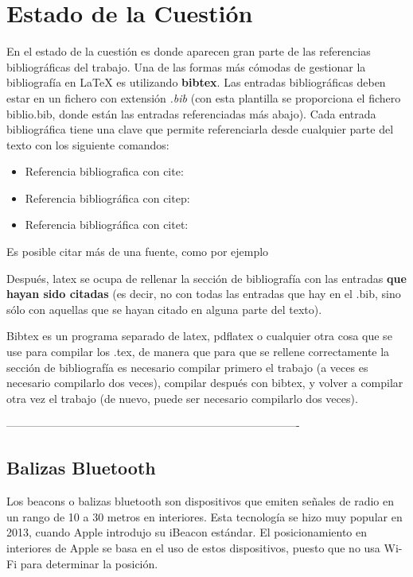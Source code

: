 \chapter{Estado de la Cuestión}
\label{cap:estadoDeLaCuestion}

En el estado de la cuestión es donde aparecen gran parte de las referencias bibliográficas del trabajo. Una de las formas más cómodas de gestionar la bibliografía en {\LaTeX} es utilizando \textbf{bibtex}. Las entradas bibliográficas deben estar en un fichero con extensión \textit{.bib} (con esta plantilla se proporciona el fichero biblio.bib, donde están las entradas referenciadas más abajo). Cada entrada bibliográfica tiene una clave que permite referenciarla desde cualquier parte del texto con los siguiente comandos:

\begin{itemize}
\item Referencia bibliografica con cite: \cite{ldesc2e}
\item Referencia bibliográfica con citep: \citep{notsoshort}
\item Referencia bibliográfica con citet: \citet{latexAPrimer}
\end{itemize}

Es posible citar más de una fuente, como por ejemplo \citep{latexCompanion,LaTeXLamport,texKnuth}

Después, latex se ocupa de rellenar la sección de bibliografía con las entradas \textbf{que hayan sido citadas} (es decir, no con todas las entradas que hay en el .bib, sino sólo con aquellas que se hayan citado en alguna parte del texto).

Bibtex es un programa separado de latex, pdflatex o cualquier otra cosa que se use para compilar los .tex, de manera que para que se rellene correctamente la sección de bibliografía es necesario compilar primero el trabajo (a veces es necesario compilarlo dos veces), compilar después con bibtex, y volver a compilar otra vez el trabajo (de nuevo, puede ser necesario compilarlo dos veces). 

-------------------------------------------------------------------------------

\section{Balizas Bluetooth}

Los beacons o balizas bluetooth son dispositivos que emiten señales de radio en un rango de 10 a 30 metros en interiores. Esta tecnología se hizo muy popular en 2013, cuando Apple introdujo su iBeacon estándar. El posicionamiento en interiores de Apple se basa en el uso de estos dispositivos, puesto que no usa Wi-Fi para determinar la posición.

